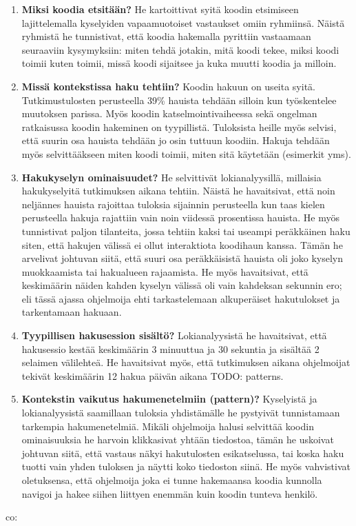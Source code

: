 \documentclass[finnish]{../tktltiki2}
\theoremstyle{definition}
\theoremstyle{remark}
\begin{document}
\begin{enumerate}
  \item {\bf Miksi koodia etsitään?}
    He kartoittivat syitä koodin etsimiseen lajittelemalla kyselyiden vapaamuotoiset vastaukset omiin ryhmiinsä. Näistä ryhmistä he tunnistivat, että koodia hakemalla pyrittiin vastaamaan seuraaviin kysymyksiin: miten tehdä jotakin, mitä koodi tekee, miksi koodi toimii kuten toimii, missä koodi sijaitsee ja kuka muutti koodia ja milloin.
  \item {\bf Missä kontekstissa haku tehtiin?}
    Koodin hakuun on useita syitä. Tutkimustulosten perusteella 39\% hauista tehdään silloin kun työskentelee muutoksen parissa. Myös koodin katselmointivaiheessa sekä ongelman ratkaisussa koodin hakeminen on tyypillistä. Tuloksista heille myös selvisi, että suurin osa hauista tehdään jo osin tuttuun koodiin. Hakuja tehdään myös selvittääkseen miten koodi toimii, miten sitä käytetään (esimerkit yms).
  \item {\bf Hakukyselyn ominaisuudet?}
    He selvittivät lokianalyysillä, millaisia hakukyselyitä tutkimuksen aikana tehtiin. Näistä he havaitsivat, että noin neljännes hauista rajoittaa tuloksia sijainnin perusteella kun taas kielen perusteella hakuja rajattiin vain noin viidessä prosentissa hauista.
    He myös tunnistivat paljon tilanteita, jossa tehtiin kaksi tai useampi peräkkäinen haku siten, että hakujen välissä ei ollut interaktiota koodihaun kanssa. Tämän he arvelivat johtuvan siitä, että suuri osa peräkkäisistä hauista oli joko kyselyn muokkaamista tai hakualueen rajaamista. He myös havaitsivat, että keskimäärin näiden kahden kyselyn välissä oli vain kahdeksan sekunnin ero; eli tässä ajassa ohjelmoija ehti tarkastelemaan alkuperäiset hakutulokset ja tarkentamaan hakuaan.
  \item {\bf Tyypillisen hakusession sisältö?}
    Lokianalyysistä he havaitsivat, että hakusessio kestää keskimäärin 3 minuuttua ja 30 sekuntia ja sisältää 2 selaimen välilehteä. He havaitsivat myös, että tutkimuksen aikana ohjelmoijat tekivät keskimäärin 12 hakua päivän aikana
    TODO: patterns.
  \item {\bf Kontekstin vaikutus hakumenetelmiin (pattern)?}
    Kyselyistä ja lokianalyysistä saamillaan tuloksia yhdistämälle he pystyivät tunnistamaan tarkempia hakumenetelmiä. Mikäli ohjelmoija halusi selvittää koodin ominaisuuksia he harvoin klikkasivat yhtään tiedostoa, tämän he uskoivat johtuvan siitä, että vastaus näkyi hakutulosten esikatselussa, tai koska haku tuotti vain yhden tuloksen ja näytti koko tiedoston siinä. He myös vahvistivat oletuksensa, että ohjelmoija joka ei tunne hakemaansa koodia kunnolla navigoi ja hakee siihen liittyen enemmän kuin koodin tunteva henkilö.

\end{enumerate}
co:
\end{document}
